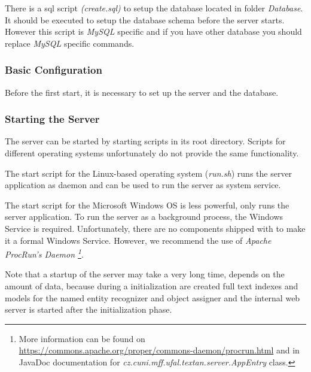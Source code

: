 There is a sql script \emph{(create.sql)} to setup the database located in folder
\emph{Database}. It should be executed to setup the database schema before the server
starts. However this script is \emph{MySQL} specific 
 and if you have other database you should replace \emph{MySQL} specific commands.


\subsubsection{Basic Configuration}

Before the first start, it is necessary to set up the server and the database.




\subsubsection{Starting the Server}

The server can be started by starting scripts in its root directory. Scripts for
different operating systems unfortunately do not provide the same functionality.

The start script for the Linux-based operating system (\emph{run.sh}) runs the
server application as daemon and can be used to run the server as system service.

The start script for the Microsoft Windows OS is less powerful, only runs the
server application. To run the server as a background process, the Windows Service
is required. Unfortunately, there are no components shipped with \textan{}
to make it a formal Windows Service. However, we recommend the use of \emph{Apache
ProcRun's Daemon \footnote{More information can be found on
\url{https://commons.apache.org/proper/commons-daemon/procrun.html} and in JavaDoc
documentation for \emph{cz.cuni.mff.ufal.textan.server.AppEntry} class.}}.

Note that a startup of the server may take a very long time, depends on the amount
of data, because during a initialization are created full text indexes and models
for the named entity recognizer and object assigner and the internal web server
is started after the initialization phase.

